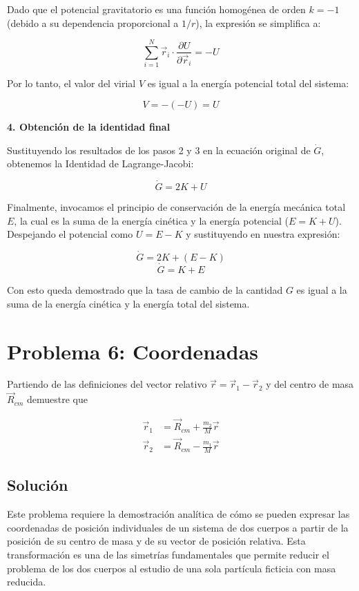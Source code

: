 \documentclass[a4paper]{article}
\begin{document}
Dado que el potencial gravitatorio es una función homogénea de orden $k = -1$ (debido a su dependencia proporcional a $1/r$), la expresión se simplifica a:

$$ \sum_{i=1}^N \vec{r}_i \cdot \frac{\partial U}{\partial \vec{r}_i} = -U $$

Por lo tanto, el valor del virial $V$ es igual a la energía potencial total del sistema:

$$ V = -(-U) = U $$

\textbf{4. Obtención de la identidad final}

Sustituyendo los resultados de los pasos 2 y 3 en la ecuación original de $\dot{G}$, obtenemos la Identidad de Lagrange-Jacobi:

$$ \dot{G} = 2K + U $$

Finalmente, invocamos el principio de conservación de la energía mecánica total $E$, la cual es la suma de la energía cinética y la energía potencial ($E = K + U$). Despejando el potencial como $U = E - K$ y sustituyendo en nuestra expresión:

$$ \dot{G} = 2K + (E - K) $$
$$ \dot{G} = K + E $$

Con esto queda demostrado que la tasa de cambio de la cantidad $G$ es igual a la suma de la energía cinética y la energía total del sistema.


\section{Problema 6: Coordenadas}
Partiendo de las definiciones del vector relativo $\vec{r}=\vec{r}_1-\vec{r}_2$ y del centro de masa $\vec{R}_{cm}$ demuestre que 

\begin{align*}
\vec{r}_1 &= \vec{R}_{cm} + \frac{m_2}{M}\vec{r} \\
\vec{r}_2 &= \vec{R}_{cm} - \frac{m_1}{M}\vec{r}
\end{align*}

\subsection{Solución}

Este problema requiere la demostración analítica de cómo se pueden expresar las coordenadas de posición individuales de un sistema de dos cuerpos a partir de la posición de su centro de masa y de su vector de posición relativa. Esta transformación es una de las simetrías fundamentales que permite reducir el problema de los dos cuerpos al estudio de una sola partícula ficticia con masa reducida.
\end{document}
